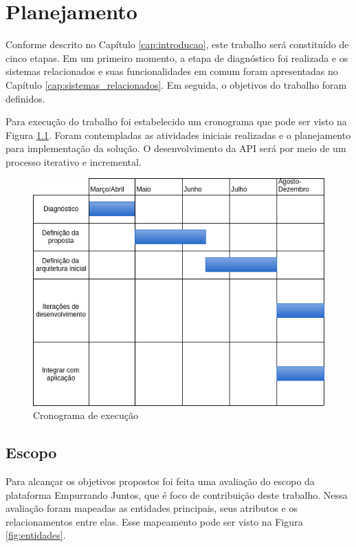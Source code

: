 \chapter{Planejamento}
Conforme descrito no Capítulo \ref{cap:introducao}, este trabalho será constituído de cinco etapas.
Em um primeiro momento, a etapa de diagnóstico foi realizada e os sistemas relacionados e suas funcionalidades em comum 
foram apresentadas no Capítulo \ref{cap:sistemas_relacionados}. Em seguida, o objetivos do trabalho foram definidos. 

Para execução do trabalho foi estabelecido um cronograma que pode ser visto na Figura \ref{fig:cronograma}.
Foram contempladas as atividades iniciais realizadas e o planejamento para implementação da solução.
O desenvolvimento da API será por meio de um processo iterativo e incremental. 

\begin{figure}[h!]
\centering
\includegraphics[scale=0.6]{figuras/cronograma.png}
\caption{Cronograma de execução}
\label{fig:cronograma}
\end{figure}

\section{Escopo}
Para alcançar os objetivos propostos foi feita uma avaliação do escopo da plataforma Empurrando Juntos, que é foco de contribuição deste trabalho.
Nessa avaliação foram mapeadas as entidades principais, seus atributos e os relacionamentos entre elas. 
Esse mapeamento pode ser visto na Figura \ref{fig:entidades}.

